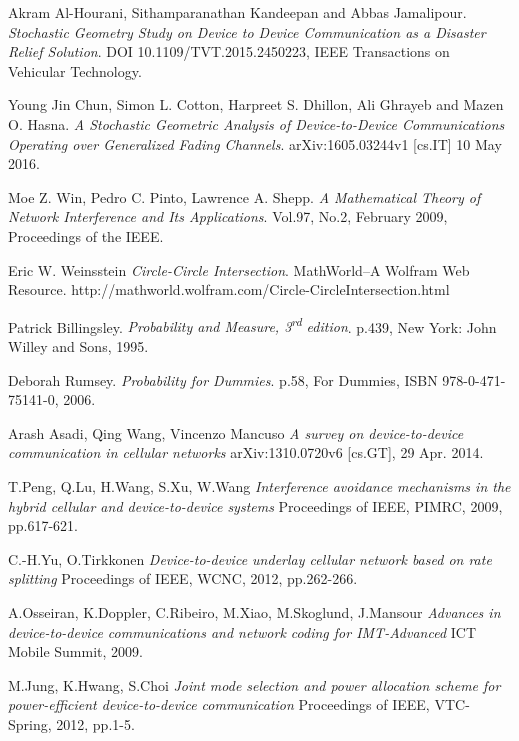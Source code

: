 \newpage
\begin{thebibliography}{50}
  Akram Al-Hourani, Sithamparanathan Kandeepan and Abbas Jamalipour.
  \textit{Stochastic Geometry Study on Device to Device Communication as a Disaster Relief Solution}.
  DOI 10.1109/TVT.2015.2450223, IEEE Transactions on Vehicular Technology.
  
  Young Jin Chun, Simon L. Cotton, Harpreet S. Dhillon, Ali Ghrayeb and Mazen O. Hasna.
  \textit{A Stochastic Geometric Analysis of Device-to-Device Communications Operating over Generalized Fading Channels}.
  arXiv:1605.03244v1 [cs.IT] 10 May 2016.
  
  Moe Z. Win, Pedro C. Pinto, Lawrence A. Shepp.
  \textit{A Mathematical Theory of Network Interference and Its Applications}.
  Vol.97, No.2, February 2009, Proceedings of the IEEE.
  
  Eric W. Weinsstein
  \textit{Circle-Circle Intersection}.
  MathWorld--A Wolfram Web Resource. http://mathworld.wolfram.com/Circle-CircleIntersection.html
  
  Patrick Billingsley.
  \textit{Probability and Measure, 3\textsuperscript{rd} edition}.
   p.439, New York: John Willey and Sons, 1995.
   
  Deborah Rumsey.
  \textit{Probability for Dummies}.
  p.58, For Dummies, ISBN 978-0-471-75141-0, 2006.

  Arash Asadi, Qing Wang, Vincenzo Mancuso
  \textit{A survey on device-to-device communication in cellular networks}
  arXiv:1310.0720v6 [cs.GT], 29 Apr. 2014.
 
  T.Peng, Q.Lu, H.Wang, S.Xu, W.Wang
  \textit {Interference avoidance mechanisms in the hybrid cellular and device-to-device systems}
  Proceedings of IEEE, PIMRC, 2009, pp.617-621.

  C.-H.Yu, O.Tirkkonen
  \textit {Device-to-device underlay cellular network based on rate splitting}
  Proceedings of IEEE, WCNC, 2012, pp.262-266.

  A.Osseiran, K.Doppler, C.Ribeiro, M.Xiao, M.Skoglund, J.Mansour
  \textit {Advances in device-to-device communications and network coding for IMT-Advanced}
  ICT Mobile Summit, 2009.

  M.Jung, K.Hwang, S.Choi
  \textit {Joint mode selection and power allocation scheme for power-efficient device-to-device communication}
  Proceedings of IEEE, VTC-Spring, 2012, pp.1-5.


\end{thebibliography}
